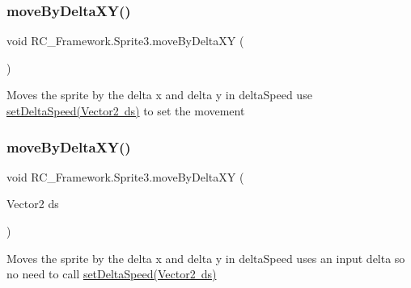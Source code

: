 \subsubsection{\texorpdfstring{move\+By\+Delta\+X\+Y()}{moveByDeltaXY()}\hspace{0.1cm}{\footnotesize\ttfamily [1/2]}}
{\footnotesize\ttfamily void R\+C\+\_\+\+Framework.\+Sprite3.\+move\+By\+Delta\+XY (\begin{DoxyParamCaption}{ }\end{DoxyParamCaption})}



Moves the sprite by the delta x and delta y in delta\+Speed use \mbox{\hyperlink{class_r_c___framework_1_1_sprite3_a9a00bb05c798cc43c3518bb5ae6d0186}{set\+Delta\+Speed(\+Vector2 ds)}} to set the movement 

\mbox{\label{class_r_c___framework_1_1_sprite3_a0cbdba681e9a06a6270415b1a527536e}} 
\subsubsection{\texorpdfstring{move\+By\+Delta\+X\+Y()}{moveByDeltaXY()}\hspace{0.1cm}{\footnotesize\ttfamily [2/2]}}
{\footnotesize\ttfamily void R\+C\+\_\+\+Framework.\+Sprite3.\+move\+By\+Delta\+XY (\begin{DoxyParamCaption}\item[{Vector2}]{ds }\end{DoxyParamCaption})}



Moves the sprite by the delta x and delta y in delta\+Speed uses an input delta so no need to call \mbox{\hyperlink{class_r_c___framework_1_1_sprite3_a9a00bb05c798cc43c3518bb5ae6d0186}{set\+Delta\+Speed(\+Vector2 ds)}} 

\mbox{\label{class_r_c___framework_1_1_sprite3_a1f6400b76f55f9714cbbba19db329aa0}} 
